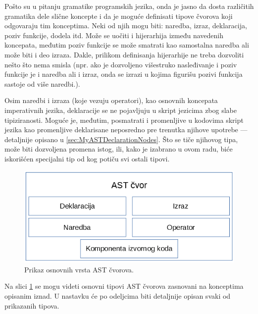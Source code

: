 Pošto su u pitanju gramatike programskih jezika, onda je jasno da dosta različitih gramatika dele slične koncepte i da je moguće definisati tipove čvorova koji odgovaraju tim konceptima. Neki od njih mogu biti: naredba, izraz, deklaracija, poziv funkcije, dodela itd. Može se uočiti i hijerarhija između navedenih koncepata, međutim poziv funkcije se može smatrati kao samostalna naredba ali može biti i deo izraza. Dakle, prilikom definisanja hijerarhije ne treba dozvoliti nešto što nema smisla (npr. ako je dozvoljeno višestruko nasleđivanje i poziv funkcije je i naredba ali i izraz, onda se izrazi u kojima figurišu pozivi funkcija sastoje od više naredbi.).

Osim naredbi i izraza (koje vezuju operatori), kao osnovnih koncepata imperativnih jezika, deklaracije se ne pojavljuju u skript jezicima zbog slabe tipiziranosti. Moguće je, međutim, posmatrati i promenljive u kodovima skript jezika kao promenljive deklarisane neposredno pre trenutka njihove upotrebe --- detaljnije opisano u \ref{sec:MyASTDeclarationNodes}. Što se tiče njihovog tipa, može biti dozvoljena promena istog, ili, kako je izabrano u ovom radu, biće iskorišćen specijalni tip od kog potiču svi ostali tipovi.

\begin{figure}[h!]
\centering
\includegraphics[scale=0.6]{images/nodes.png}
\caption{Prikaz osnovnih vrsta AST čvorova.}
\label{fig:ASTNode}
\end{figure}

Na slici \ref{fig:ASTNode} se mogu videti osnovni tipovi AST čvorova zasnovani na konceptima opisanim iznad. U nastavku će po odeljcima biti detaljnije opisan svaki od prikazanih tipova.





